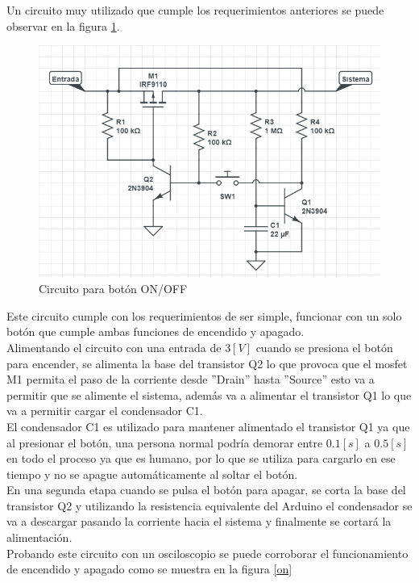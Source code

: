 Un circuito muy utilizado que cumple los requerimientos anteriores se puede observar en la figura \ref{esquematico}.\\

\begin{figure}[H]
\centering
\includegraphics[scale=0.7]{figuras/eagle/circuito.png}
\caption{Circuito para botón ON/OFF}
\label{esquematico}
\end{figure}

Este circuito cumple con los requerimientos de ser simple, funcionar con un solo botón que cumple ambas funciones de encendido y apagado. \\
Alimentando el circuito con una entrada de $3[V]$ cuando se presiona el botón para encender, se alimenta la base del transistor Q2 lo que provoca que el mosfet M1 permita el paso de la corriente desde ''Drain'' hasta ''Source'' esto va a permitir que se alimente el sistema, además va a alimentar el transistor Q1 lo que va a permitir cargar el condensador C1.\\
El condensador C1 es utilizado para mantener alimentado el transistor Q1 ya que al presionar el botón, una persona normal podría demorar entre $0.1[s]$ a $0.5[s]$ en todo el proceso ya que es humano, por lo que se utiliza para cargarlo en ese tiempo y no se apague automáticamente al soltar el botón.\\
En una segunda etapa cuando se pulsa el botón para apagar, se corta la base del transistor Q2 y utilizando la resistencia equivalente del Arduino el condensador se va a descargar pasando la corriente hacia el sistema y finalmente se cortará la alimentación.\\
Probando este circuito con un osciloscopio se puede corroborar el funcionamiento de encendido y apagado como se muestra en la figura  \ref{on}

